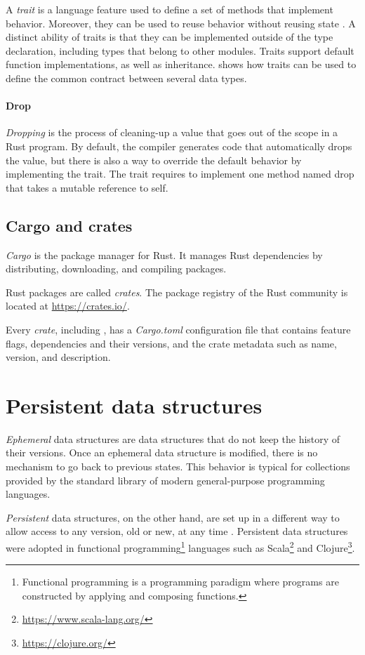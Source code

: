 A \emph{trait} is a language feature used to define a set of methods that implement behavior. Moreover, they can be used to reuse behavior without reusing state \cite{schaerli-ducasse-nierstrasz-traits}. A distinct ability of traits is that they can be implemented outside of the type declaration, including types that belong to other modules. Traits support default function implementations, as well as inheritance.  shows how traits can be used to define the common contract between several data types.

\paragraph{Drop}
\emph{Dropping} is the process of cleaning-up a value that goes out of the scope in a Rust program. By default, the compiler generates code that automatically drops the value, but there is also a way to override the default behavior by implementing the  trait. The  trait requires to implement one method named drop that takes a mutable reference to self.

\subsection{Cargo and crates}
\emph{Cargo} is the package manager for Rust. It manages Rust dependencies by distributing, downloading, and compiling packages.

Rust packages are called \emph{crates}. The package registry of the Rust community is located at \url{https://crates.io/}.

Every \emph{crate}, including \pvecrs{}, has a \emph{Cargo.toml} configuration file that contains feature flags, dependencies and their versions, and the crate metadata such as name, version, and description.

\section{Persistent data structures}
\label{sec:psds}

\emph{Ephemeral} data structures are data structures that do not keep the history of their versions. Once an ephemeral data structure is modified, there is no mechanism to go back to previous states. This behavior is typical for collections provided by the standard library of modern general-purpose programming languages.

\emph{Persistent} data structures, on the other hand, are set up in a different way to allow access to any version, old or new, at any time \cite{making-data-structures-persistent}. Persistent data structures were adopted in functional programming\footnote{Functional programming is a programming paradigm where programs are constructed by applying and composing functions.} languages such as Scala\footnote{\url{https://www.scala-lang.org/}} and Clojure\footnote{\url{https://clojure.org/}}.

